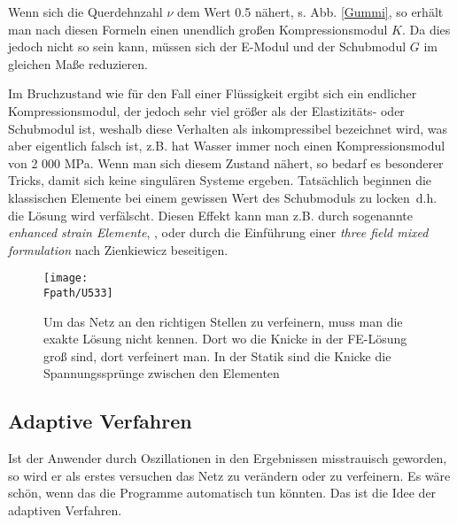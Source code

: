 {{Wenn sich die Querdehnzahl $\nu$ dem Wert 0.5 n\"{a}hert, s. Abb. \ref{Gummi}, so erh\"{a}lt man nach diesen Formeln einen unendlich gro{\ss}en Kompressionsmodul $K$. Da dies jedoch nicht so sein kann, m\"{u}ssen sich der E-Modul und der Schubmodul $G$ im gleichen Ma{\ss}e reduzieren.

Im Bruchzustand wie f\"{u}r den Fall einer Fl\"{u}ssigkeit ergibt sich ein endlicher Kompressionsmodul, der jedoch sehr viel gr\"{o}{\ss}er als der Elastizit\"{a}ts- oder Schubmodul ist, weshalb diese Verhalten als inkompressibel bezeichnet wird, was aber eigentlich falsch ist, z.B. hat Wasser immer noch einen Kompressionsmodul von 2 000 MPa. Wenn man sich diesem Zustand n\"{a}hert, so bedarf es besonderer Tricks, damit sich keine singul\"{a}ren Systeme ergeben. Tats\"{a}chlich beginnen die klassischen Elemente bei einem gewissen Wert des Schubmoduls zu \glq locken\grq\, d.h. die L\"{o}sung wird verf\"{a}lscht. Diesen Effekt kann man z.B. durch sogenannte {\em enhanced strain Elemente\/}, \cite{Wriggers}, oder durch die Einf\"{u}hrung einer {\em three field mixed formulation \/} nach Zienkiewicz \cite{Z1} beseitigen.
\begin{figure}[h]
\if {} \sidecaption \fi
\texttt{[image: \\Fpath/U533]}
\caption{Um das Netz an den richtigen Stellen zu verfeinern, muss man die exakte L\"{o}sung nicht kennen. Dort wo die Knicke in der FE-L\"{o}sung gro{\ss} sind, dort verfeinert man. In der Statik sind die Knicke die Spannungsspr\"{u}nge zwischen den Elementen}\label{U533}
\end{figure}

{\textcolor{sectionTitleBlue}{\section{Adaptive Verfahren}}} \label{Adaptiv}
Ist der Anwender durch Oszillationen in den Ergebnissen misstrauisch geworden, so wird er als erstes versuchen das Netz zu ver\"{a}ndern oder zu verfeinern. Es w\"{a}re sch\"{o}n, wenn das die Programme automatisch tun k\"{o}nnten. Das ist die Idee der adaptiven Verfahren.

}}
